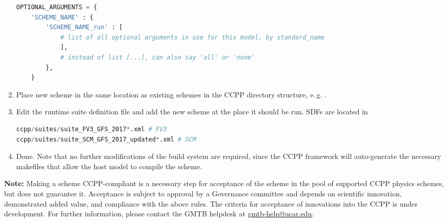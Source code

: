 \begin{enumerate}
\begin{lstlisting}[language=Python]
OPTIONAL_ARGUMENTS = {
    'SCHEME_NAME' : {
        'SCHEME_NAME_run' : [
            # list of all optional arguments in use for this model, by standard_name
            ],
            # instead of list [...], can also say 'all' or 'none'
        },
    }
\end{lstlisting}
\item Place new scheme in the same location as existing schemes in the CCPP directory structure, e.\,g. .
\item Edit the runtime suite definition file and add the new scheme at the place it should be run. SDFs are located in
\begin{lstlisting}[language=Python]
ccpp/suites/suite_FV3_GFS_2017*.xml # FV3
ccpp/suites/suite_SCM_GFS_2017_updated*.xml # SCM
\end{lstlisting}
\item Done. Note that no further modifications of the build system are required, since the CCPP framework will auto-generate the necessary makefiles that allow the host model to compile the scheme.
\end{enumerate}
\textbf{Note:} Making a scheme CCPP-compliant is a necessary step for acceptance of the scheme in the pool of supported CCPP physics schemes, but does not guarantee it. Acceptance is subject to approval by a Governance committee and depends on scientific innovation, demonstrated added value, and compliance with the above rules. The criteria for acceptance of innovations into the CCPP is under development. For further information, please contact the GMTB helpdesk at \url{gmtb-help@ucar.edu}.
